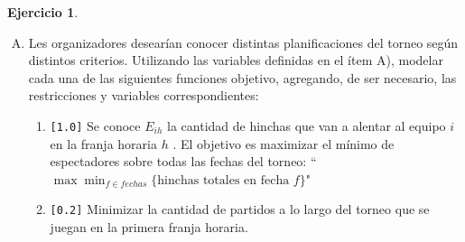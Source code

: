 \documentclass[a4paper,oneside,12pt]{amsart}
\def \ds{\displaystyle}
\theoremstyle{definition}
\newtheorem{quest}{Ejercicio}
\begin{document}
\begin{quest}
\begin{enumerate}[A)]
        \textbf{Sugerencia:} para cada equipo $i$ puede ser útil considerar $P_i=\{p\in\mathcal{P}\colon i\in p\}$
    \item Les organizadores desearían conocer distintas planificaciones del torneo según distintos criterios. Utilizando las variables definidas en el ítem A), modelar cada una de las siguientes funciones objetivo, agregando, de ser necesario, las restricciones y variables correspondientes:
        \begin{enumerate}[1.]
            \item \verb|[1.0]| Se conoce $E_{ih}$ la cantidad de hinchas que van a alentar al equipo $i$ en la franja horaria $h$ . El objetivo es maximizar el mínimo de espectadores sobre todas las fechas del torneo: {``$\max \ds\min_{f\in fechas} \{\text{hinchas totales en fecha $f$}\}$}"
            \item \verb|[0.2]| Minimizar la cantidad de partidos a lo largo del torneo que se juegan en la primera franja horaria.
        \end{enumerate}
            
\end{enumerate}


\end{quest}


\end{document}
